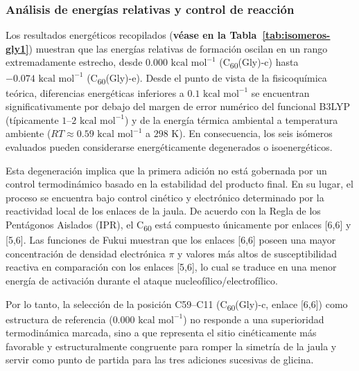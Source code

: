 \subsubsection{Análisis de energías relativas y control de reacción}

Los resultados energéticos recopilados (\textbf{véase en la Tabla~\ref{tab:isomeros-gly1}}) muestran que las energías relativas de formación oscilan en un rango extremadamente estrecho, desde $0.000\text{ kcal mol}^{-1}$ (C\textsubscript{60}(Gly)-c) hasta $-0.074\text{ kcal mol}^{-1}$ (C\textsubscript{60}(Gly)-e). Desde el punto de vista de la fisicoquímica teórica, diferencias energéticas inferiores a $0.1\text{ kcal mol}^{-1}$ se encuentran significativamente por debajo del margen de error numérico del funcional B3LYP (típicamente $1\text{--}2\text{ kcal mol}^{-1}$) y de la energía térmica ambiental a temperatura ambiente ($RT \approx 0.59\text{ kcal mol}^{-1}$ a $298\text{ K}$). En consecuencia, los seis isómeros evaluados pueden considerarse energéticamente degenerados o isoenergéticos.

Esta degeneración implica que la primera adición no está gobernada por un control termodinámico basado en la estabilidad del producto final. En su lugar, el proceso se encuentra bajo control cinético y electrónico determinado por la reactividad local de los enlaces de la jaula. De acuerdo con la Regla de los Pentágonos Aislados (IPR), el C\textsubscript{60} está compuesto únicamente por enlaces [6,6] y [5,6]. Las funciones de Fukui muestran que los enlaces [6,6] poseen una mayor concentración de densidad electrónica $\pi$ y valores más altos de susceptibilidad reactiva en comparación con los enlaces [5,6], lo cual se traduce en una menor energía de activación durante el ataque nucleofílico/electrofílico.

Por lo tanto, la selección de la posición C59--C11 (C\textsubscript{60}(Gly)-c, enlace [6,6]) como estructura de referencia ($0.000\text{ kcal mol}^{-1}$) no responde a una superioridad termodinámica marcada, sino a que representa el sitio cinéticamente más favorable y estructuralmente congruente para romper la simetría de la jaula y servir como punto de partida para las tres adiciones sucesivas de glicina.

